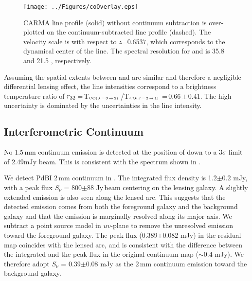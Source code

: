 \documentclass[]{emulateapj}
\begin{document}
\begin{figure}[!Htbp]
\centering
\texttt{[image: ../Figures/coOverlay.eps]}
\caption{CARMA \cco line profile (solid) without continuum subtraction is
over-plotted on the continuum-subtracted \bco line profile (dashed).
The velocity scale is with respect to $z$=0.6537, which corresponds to the
dynamical center of the \bco line. The spectral resolution for \cco and \bco
is 35.8 \kms and 21.5 \kms, respectively.
 \label{fig:co32spec}}
\end{figure}

Assuming the spatial extents between \bco and \cco are similar and therefore
a negligible differential lensing effect, the line intensities
correspond to a brightness temperature ratio of
$r_{\rm 32}$\,=\,T$_{\tiny \mbox{CO($J$\,=\,3\,$\rightarrow$\,2) }}$/T$_{\tiny \mbox{CO($J$\,=\,2\,$\rightarrow$\,1) }}$\,=\,0.66\,$\pm$\,0.41.
The high uncertainty is dominated by the uncertainties in the \cco line
intensity.

\subsection{Interferometric Continuum} %
No 1.5\,mm continuum emission is detected at the position of \cco
down to a 3$\sigma$ limit of 2.49mJy beam\pmOne.
This is consistent with the spectrum shown in .

We detect PdBI 2\,mm continuum in . The integrated flux density is
1.2$\pm$0.2 mJy, with a peak flux $S_\nu$ = 800$\pm$88 \micron Jy\,beam\pmOne
centering on the lensing galaxy. A slightly extended emission is also seen
along the lensed arc. This suggests that the detected emission comes from
both the foreground galaxy and the background galaxy and that the
emission is marginally resolved along its major axis.
We subtract a point source model in $uv$-plane to remove the unresolved
emission toward the foreground galaxy. The peak flux (0.389$\pm$0.082 mJy)
in the residual map coincides with the lensed arc, and is consistent with
the difference between the integrated and the peak flux in the
original continuum map ($\sim$0.4 mJy). We therefore adopt
$S_\nu$ = 0.39$\pm$0.08 mJy as the 2\,mm continuum emission toward
the background galaxy.
\end{document}
